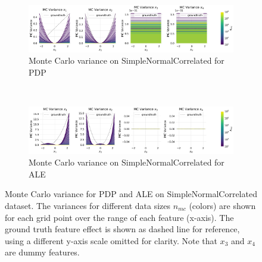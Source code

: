 \documentclass[runningheads]{llncs}
\begin{document}
\begin{figure}[h!]
    \centering
    \begin{subfigure}[b]{\textwidth}
        \centering
        \includegraphics[width=\textwidth]{img/SNC-all/mc_variance_pdp.png}
        \caption{Monte Carlo variance on SimpleNormalCorrelated for PDP}
    \end{subfigure}
    \\[10pt]
    \vfill
    \begin{subfigure}[b]{\textwidth}
        \centering
        \includegraphics[width=\textwidth]{img/SNC-all/mc_variance_ale.png}
        \caption{Monte Carlo variance on SimpleNormalCorrelated for ALE}
    \end{subfigure}
    \caption{Monte Carlo variance for PDP and ALE on SimpleNormalCorrelated dataset.
        The variances for different data sizes $n_{mc}$ (colors) are shown for each grid
        point over the range of each feature (x-axis). The ground truth feature effect is
        shown as dashed line for reference, using a different y-axis scale omitted for
        clarity. Note that $x_3$ and $x_4$ are dummy features.}
    \label{fig:mc-variance-snc}  %
\end{figure}
\end{document}
